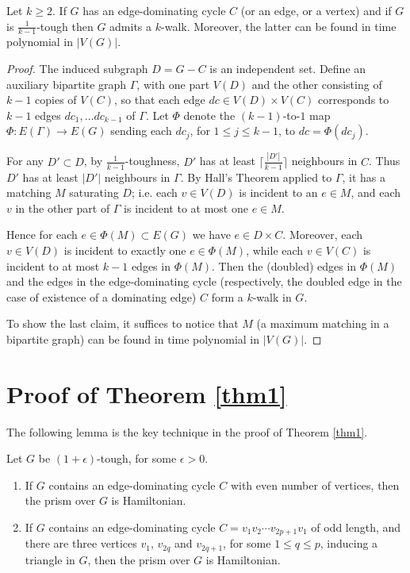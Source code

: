 \documentclass{ws-jktr}
\newcommand{\qed}{\prbox}
\begin{document}
\begin{lemma}\label{addtec}
Let $k\geq 2$.
If $G$ has an edge-dominating cycle $C$ (or an edge, or a vertex)
and if $G$ is $\frac{1}{k-1}$-tough then $G$ admits a $k$-walk.
Moreover, the latter can be found in time polynomial in $|V(G)|$.
\end{lemma}
\begin{proof}
The induced subgraph $D=G-C$ is an independent set. Define an auxiliary bipartite
graph $\Gamma$, with one part $V(D)$ and the other consisting of $k-1$ copies of $V(C)$,
so that each edge $dc\in V(D)\times V(C)$ corresponds to $k-1$ edges
$dc_1,\dots dc_{k-1}$ of $\Gamma$. Let $\Phi$ denote the $(k-1)$-to-$1$ map
$\Phi: E(\Gamma)\to E(G)$ sending each $dc_j$, for $1\leq j\leq k-1$, to $dc=\Phi(dc_j)$.

For any $D'\subset D$, by $\frac{1}{k-1}$-toughness, $D'$ has at least
$\lceil\frac{|D'|}{k-1}\rceil$ neighbours in $C$. Thus $D'$ has at
least $|D'|$ neighbours in $\Gamma$.  By Hall's Theorem \cite[Theorem 16.4]{bomu08} applied
to $\Gamma$, it has a matching $M$ saturating $D$; i.e.  each $v\in V(D)$ is
incident to an $e\in M$, and each $v$ in the other part of $\Gamma$ is
incident to at most one $e\in M$.

Hence for each $e\in\Phi(M)\subset E(G)$ we have $e\in D\times C$.
Moreover, each $v\in V(D)$ is incident to
exactly one $e\in \Phi(M)$, while each $v\in V(C)$ is incident to at most
$k-1$ edges in $\Phi(M)$. Then the (doubled) edges in $\Phi(M)$ and the edges
in the edge-dominating cycle (respectively, the doubled edge in the case of existence of a dominating edge) $C$ form a
$k$-walk in $G$.

To show the last claim, it suffices to notice that $M$ (a maximum matching
in a bipartite graph) can be found in time polynomial
in $|V(G)|$. \qed
\end{proof}

\section{Proof of Theorem \ref{thm1}}
The following lemma is the key technique in the proof of Theorem \ref{thm1}.
\begin{lemma}\label{keylem}
Let $G$ be $(1+\epsilon)$-tough, for some $\epsilon>0$.
\begin{enumerate}
\item If $G$ contains an edge-dominating cycle $C$ with even number of vertices, then the prism over $G$ is Hamiltonian.
\item If $G$ contains an edge-dominating cycle $C=v_1v_2\cdots v_{2p+1}v_1$ of odd length, and there are three vertices $v_1$, $v_{2q}$ and $v_{2q+1}$, for some $1\le q\le p$, inducing a triangle in $G$, then the prism over $G$ is Hamiltonian.
\end{enumerate}
\end{lemma}
\end{document}
